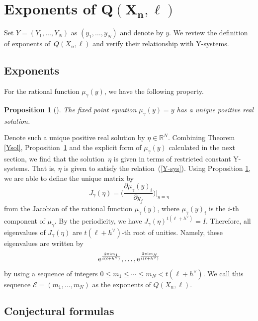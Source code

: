 \documentclass[10pt,a4paper]{amsart}
\numberwithin{equation}{section}
\newtheorem{Proposition}[Theorem]{Proposition}
\newcommand{\R}{{\mathbb R}}
\begin{document}
	\section[Exponents of Q(X\_n,ell)]{Exponents of $\boldsymbol{Q(X_n,\ell)}$}
	
Set $Y=(Y_1,\dots,Y_N)$ as $(y_1,\dots,y_N)$ and denote by $y$.
We review the definition of exponents of~$Q(X_n,\ell)$ and verify their relationship with Y-systems.
	
	\subsection{Exponents}
For the rational function $\mu_\gamma(y)$, we have the following property.
		\begin{Proposition}[{\cite{M}}]\label{eta}
		The fixed point equation $\mu_\gamma(y)=y$ has a unique positive real solution.
		\end{Proposition}
Denote such a unique positive real solution by $\eta\in\R^N$.
Combining Theorem \ref{Ysol}, Proposition~\ref{eta} and the explicit form of $\mu_\gamma(y)$ calculated in the next section, we find that the solution~$\eta$ is given in terms of restricted constant Y-systems.
That is, $\eta$ is given to satisfy the relation~(\ref{Y-sys}).
Using Proposition \ref{eta}, we are able to define the unique matrix by
		\[J_\gamma(\eta)=\biggl(\frac{\partial\mu_\gamma(y)_i}{\partial y_j}\biggr)\biggr|_{y=\eta}\]
from the Jacobian of the rational function $\mu_\gamma(y)$, where $\mu_\gamma(y)_i$ is the $i$-th component of $\mu_\gamma$.
By the periodicity, we have $J_\gamma(\eta)^{t(\ell+h^\vee)}=I$.
Therefore, all eigenvalues of $J_\gamma(\eta)$ are $t(\ell+h^\vee)$-th root of unities.
Namely, these eigenvalues are written by
\[
{\rm e}^\frac{2\pi {\rm i}m_1}{t(\ell+h^\vee)},\dots,{\rm e}^\frac{2\pi {\rm i}m_N}{t(\ell+h^\vee)}
\]
by using a sequence of integers $0\leq m_1\leq\cdots\leq m_N<t(\ell+h^\vee)$.
We call this sequence $\mathcal{E}=(m_1,\dots,m_N)$ as the exponents of $Q(X_n,\ell)$.
		
	\subsection{Conjectural formulas}
\end{document}
